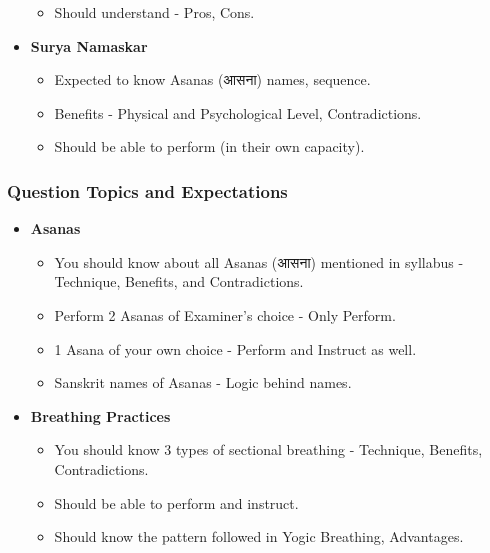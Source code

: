 \begin{frame}[fragile]
\begin{itemize}
\begin{itemize}
            \item Should understand - Pros, Cons.
        \end{itemize}
        \item \textbf{Surya Namaskar}
        \begin{itemize}
            \item Expected to know Asanas (आसना) names, sequence.
            \item Benefits - Physical and Psychological Level, Contradictions.
            \item Should be able to perform (in their own capacity).
        \end{itemize}
    \end{itemize}
\end{frame}


\begin{frame}[fragile]\frametitle{Question Topics and Expectations}
    \begin{itemize}
        \item \textbf{Asanas}
        \begin{itemize}
            \item You should know about all Asanas (आसना) mentioned in syllabus - Technique, Benefits, and Contradictions.
            \item Perform 2 Asanas of Examiner's choice - Only Perform.
            \item 1 Asana of your own choice - Perform and Instruct as well.
            \item Sanskrit names of Asanas - Logic behind names.
        \end{itemize}
        \item \textbf{Breathing Practices}
        \begin{itemize}
            \item You should know 3 types of sectional breathing - Technique, Benefits, Contradictions.
            \item Should be able to perform and instruct.
            \item Should know the pattern followed in Yogic Breathing, Advantages.
        \end{itemize}

    \end{itemize}
\end{frame}

